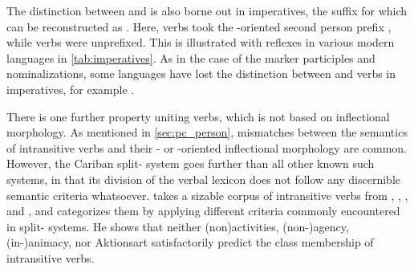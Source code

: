 



The distinction between  and  is also borne out in imperatives, the suffix for which can be reconstructed as \PC {}.
Here,  verbs took the -oriented second person prefix , while  verbs were unprefixed.
This is illustrated with reflexes in various modern languages in \cref{tab:imperatives}.
As in the case of the  marker  participles and nominalizations, some languages have lost the distinction between  and  verbs in imperatives, for example \panare.



There is one further property uniting  verbs, which is not based on inflectional morphology.
As mentioned in \cref{sec:pc_person}, mismatches between the semantics of intransitive verbs and their - or -oriented inflectional morphology are common.
However, the Cariban split- system goes further than all other known such systems, in that its division of the verbal lexicon does not follow any discernible semantic criteria whatsoever.
\textcite{meira2000split} takes a sizable corpus of intransitive verbs from \trio, \kalina, \apalai, and \wayana, and categorizes them by applying different criteria commonly encountered in split- systems.
He shows that neither (non\-)activities, %
(non-)agency, %
(in-)animacy, %
nor Aktionsart %
satisfactorily predict the class membership of intransitive verbs.

